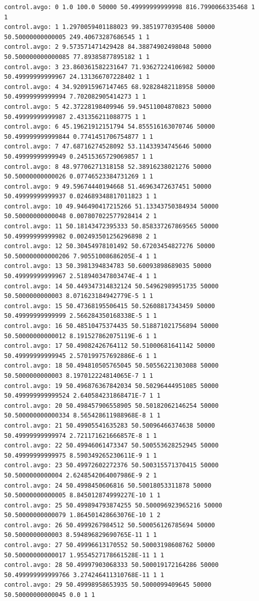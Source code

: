 \documentclass[a4paper,11pt]{article}
\begin{document}
\scriptsize
\begin{verbatim}
control.avgo: 0 1.0 100.0 50000 50.49999999999998 816.7990066335468 1 1
control.avgo: 1 1.2970059401188023 99.38519770395408 50000 50.50000000000005 249.40673287686545 1 1
control.avgo: 2 9.573571471429428 84.38874902498048 50000 50.500000000000085 77.89385877895182 1 1
control.avgo: 3 23.860361582231647 71.93627224106982 50000 50.49999999999967 24.131366707228402 1 1
control.avgo: 4 34.920915967147465 68.92828482118958 50000 50.49999999999994 7.702082905414273 1 1
control.avgo: 5 42.37228198409946 59.94511004870823 50000 50.49999999999987 2.431356211088775 1 1
control.avgo: 6 45.19621912151794 54.855516163070746 50000 50.499999999999844 0.7741451706754877 1 1
control.avgo: 7 47.68716274528092 53.11433934745646 50000 50.49999999999949 0.24515365729069857 1 1
control.avgo: 8 48.97706271318158 52.38916238021276 50000 50.50000000000026 0.07746523384731269 1 1
control.avgo: 9 49.59674440194668 51.46963472637451 50000 50.49999999999937 0.024689348817011823 1 1
control.avgo: 10 49.946490417215266 51.13343750384934 50000 50.50000000000048 0.007807022577928414 2 1
control.avgo: 11 50.18143472395333 50.858337267869565 50000 50.49999999999982 0.002493501256296898 2 1
control.avgo: 12 50.30454978101492 50.67203454827276 50000 50.500000000000206 7.90551008686205E-4 1 1
control.avgo: 13 50.3981394834783 50.60093898689035 50000 50.49999999999967 2.518940347803474E-4 1 1
control.avgo: 14 50.449347314832124 50.54962989951735 50000 50.5000000000003 8.071623184942779E-5 1 1
control.avgo: 15 50.47368195506415 50.52608817343459 50000 50.49999999999999 2.566284350168338E-5 1 1
control.avgo: 16 50.48510475374435 50.518871021756894 50000 50.50000000000012 8.191527862075119E-6 1 1
control.avgo: 17 50.49082426764112 50.51000681641142 50000 50.49999999999945 2.570199757692886E-6 1 1
control.avgo: 18 50.494810505765045 50.50556221303088 50000 50.5000000000003 8.197012224814065E-7 1 1
control.avgo: 19 50.496876367842034 50.50296444951085 50000 50.499999999999524 2.640584231868471E-7 1 1
control.avgo: 20 50.498457906558905 50.50182062146254 50000 50.500000000000334 8.565428611988968E-8 1 1
control.avgo: 21 50.49905541635283 50.50096466374638 50000 50.49999999999974 2.721171621666857E-8 1 1
control.avgo: 22 50.49946061473347 50.500553628252945 50000 50.49999999999975 8.590349265230611E-9 1 1
control.avgo: 23 50.49972602272376 50.500315571370415 50000 50.5000000000004 2.6248542064007986E-9 2 1
control.avgo: 24 50.4998450606816 50.50018053311878 50000 50.50000000000005 8.845012874999227E-10 1 1
control.avgo: 25 50.499894793874255 50.500096923965216 50000 50.50000000000079 1.864501428663076E-10 1 2
control.avgo: 26 50.4999267984512 50.500056126785694 50000 50.5000000000003 8.594896829690765E-11 1 1
control.avgo: 27 50.49996613170552 50.50003198608762 50000 50.50000000000017 1.9554527178661528E-11 1 1
control.avgo: 28 50.49997903068333 50.500019172164286 50000 50.499999999999766 3.274246411310768E-11 1 1
control.avgo: 29 50.49998958653935 50.5000099409645 50000 50.50000000000045 0.0 1 1
\end{verbatim}
\normalsize
\end{document}
